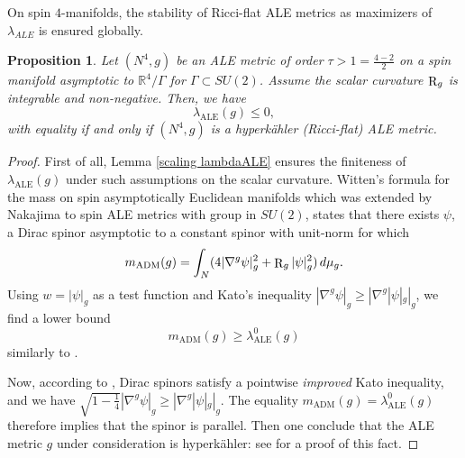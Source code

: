 \documentclass[a4paper,11pt,reqno]{amsart}
\newtheorem{prop}[defn]{Proposition}
\def\R{\mathop{\rm R}\nolimits}
\numberwithin{equation}{section}
\begin{document}
	On spin $4$-manifolds, the stability of Ricci-flat ALE metrics as maximizers of ${\lambda}_{ALE}$ is ensured globally.
	\begin{prop}\label{prop-spin-def-local}
		Let $(N^4,g)$ be an ALE metric of order $\tau>1 = \frac{4-2}{2}$ on a spin manifold asymptotic to $\mathbb{R}^4\slash\Gamma$ for $\Gamma\subset SU(2)$.
		Assume the scalar curvature $\R_g$ is integrable and non-negative. Then, we have $$\lambda_{\operatorname{ALE}}(g)\leq 0,$$
		with equality if and only if $(N^4,g)$ is a hyperk\"ahler (Ricci-flat) ALE metric.
		
	\end{prop}
	\begin{proof}
		First of all, Lemma \ref{scaling lambdaALE} ensures the finiteness of $\lambda_{\operatorname{ALE}}(g)$ under such assumptions on the scalar curvature. Witten's formula \cite{wit} for the mass on spin asymptotically Euclidean manifolds which was extended by Nakajima \cite{nak} to spin ALE metrics with group in $SU(2)$, states that there exists $\psi$, a Dirac spinor asymptotic to a constant spinor with unit-norm for which 
		\begin{equation}
		m_{\operatorname{ADM}}(g)=\int_N(4|\nabla^g \psi|_g^2+\R_g|\psi|_g^2)\,d\mu_g\label{witten formula}.
		\end{equation}
		Using $w=|\psi|_g$ as a test function and Kato's inequality $|\nabla^g \psi|_g\geq |\nabla^g |\psi|_g|_g$, we find a lower bound $$m_{\operatorname{ADM}}(g)\geq \lambda_{\operatorname{ALE}}^0(g)$$ 
		similarly to \cite{Has-Per-Fct}. 
		
		Now, according to \cite[(3.9)]{Cal-Gau-Her}, Dirac spinors satisfy a pointwise \emph{improved} Kato inequality, and we have $\sqrt{1-\frac{1}{4}}|\nabla^g \psi|_g\geqslant|\nabla^g |\psi|_g|_g$. The equality $m_{\operatorname{ADM}}(g)= \lambda_{\operatorname{ALE}}^0(g)$ therefore implies that the spinor is parallel. Then one conclude that the ALE metric $g$ under consideration is hyperk\"ahler: see \cite[Proof of Theorem 3.3]{nak} for a proof of this fact.
		
	\end{proof}
	
\end{document}
